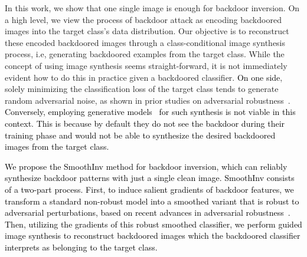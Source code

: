 \documentclass[10pt,twocolumn,letterpaper]{article}
\newcommand{\ms}[1]{\textcolor{black}{#1}}
\begin{document}


In this work, we show that one single image is enough for backdoor inversion. On a high level, we view the process of backdoor attack as encoding backdoored images into the target class's data distribution. Our objective is to reconstruct these encoded backdoored images through a class-conditional image synthesis process, i.e, generating backdoored examples from the target class. While the concept of using image synthesis seems straight-forward, it is not immediately evident how to do this in practice given a backdoored classifier. \ms{On one side}, solely minimizing the classification loss of the target class tends to generate random adversarial noise, as shown in prior studies on adversarial robustness~\cite{dimitris2018odds}. \ms{Conversely, employing generative models~\cite{goodfellow2014gan,prafulla2022diffusion} for such synthesis is not viable in this context. This is because by default they do not see the backdoor during their training phase and would not be able to synthesize the desired backdoored images from the target class.} 

\ms{We propose the SmoothInv method for backdoor inversion, which can reliably synthesize backdoor patterns with just a single clean image. SmoothInv consists of a two-part process. First, to induce salient gradients of backdoor features, we transform a standard non-robust model into a smoothed variant that is robust to adversarial perturbations, based on recent advances in adversarial robustness~\cite{cohen2019certified,carlini2022free}. Then, utilizing the gradients of this robust smoothed classifier, we perform guided image synthesis to reconstruct backdoored images which the backdoored classifier interprets as belonging to the target class.}

\end{document}
